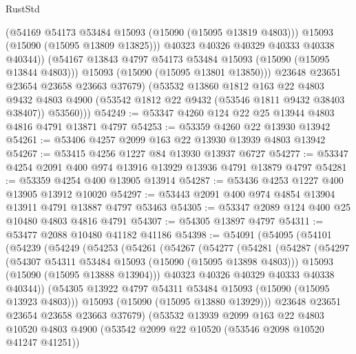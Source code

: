 \begin{lexlean}{RustStd}
\begin{coremodule}
                  (@54169 @54173 @53484 @15093 (@15090 (@15095 @13819 @4803)))
                  @15093
                  (@15090 (@15095 @13809 @13825)))
                @40323
                @40326
                @40329
                @40333
                @40338
                @40344))
            (@54167 @13843 @4797 @54173 @53484 @15093 (@15090 (@15095 @13844 @4803)))
            @15093
            (@15090 (@15095 @13801 @13850)))
          @23648
          @23651
          @23654
          @23658
          @23663
          @37679)
        (@53532
          @13860
          @1812
          @163
          @22
          @4803
          @9432
          @4803
          @4900
          (@53542 @1812 @22 @9432 (@53546 @1811 @9432 @38403 @38407))
          @53560)))
@54249 := @53347 @4260 @124 @22 @25 @13944 @4803 @4816 @4791 @13871 @4797
@54253 := @53359 @4260 @22 @13930 @13942
@54261 := @53406 @4257 @2099 @163 @22 @13930 @13939 @4803 @13942
@54267 := @53415 @4256 @1227 @84 @13930 @13937 @6727
@54277 := @53347 @4254 @2091 @400 @974 @13916 @13929 @13936 @4791 @13879 @4797
@54281 := @53359 @4254 @400 @13905 @13914
@54287 := @53436 @4253 @1227 @400 @13905 @13912 @10020
@54297 := @53443 @2091 @400 @974 @4854 @13904 @13911 @4791 @13887 @4797 @53463
@54305 := @53347 @2089 @124 @400 @25 @10480 @4803 @4816 @4791
@54307 := @54305 @13897 @4797
@54311 := @53477 @2088 @10480 @41182 @41186
@54398 := @54091
    (@54095
      (@54101
        (@54239
          (@54249
            (@54253
              (@54261
                (@54267
                  (@54277
                    (@54281
                      (@54287
                        (@54297
                          (@54307 @54311 @53484 @15093 (@15090 (@15095 @13898 @4803)))
                          @15093
                          (@15090 (@15095 @13888 @13904)))
                        @40323
                        @40326
                        @40329
                        @40333
                        @40338
                        @40344))
                    (@54305 @13922 @4797 @54311 @53484 @15093 (@15090 (@15095 @13923 @4803)))
                    @15093
                    (@15090 (@15095 @13880 @13929)))
                  @23648
                  @23651
                  @23654
                  @23658
                  @23663
                  @37679)
                (@53532
                  @13939
                  @2099
                  @163
                  @22
                  @4803
                  @10520
                  @4803
                  @4900
                  (@53542 @2099 @22 @10520 (@53546 @2098 @10520 @41247 @41251))

\end{coremodule}
\end{lexlean}
